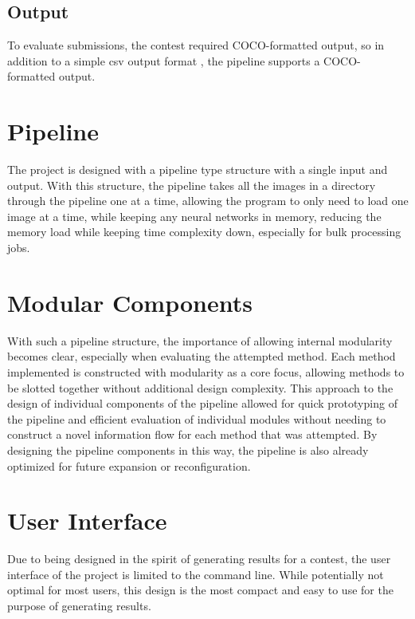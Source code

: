\subsection{Output}

To evaluate submissions, the contest required COCO-formatted output, so in addition to a simple csv output format , the pipeline supports a COCO-formatted output.

\section{Pipeline}

The project is designed with a pipeline type structure with a single input and output. With this structure, the pipeline takes all the images in a directory through the pipeline one at a time, allowing the program to only need to load one image at a time, while keeping any neural networks in memory, reducing the memory load while keeping time complexity down, especially for bulk processing jobs.

\section{Modular Components}

With such a pipeline structure, the importance of allowing internal modularity becomes clear, especially when evaluating the attempted method. Each method implemented is constructed with modularity as a core focus, allowing methods to be slotted together without additional design complexity. This approach to the design of individual components of the pipeline allowed for quick prototyping of the pipeline and efficient evaluation of individual modules without needing to construct a novel information flow for each method that was attempted. By designing the pipeline components in this way, the pipeline is also already optimized for future expansion or reconfiguration.

\section{User Interface}

Due to being designed in the spirit of generating results for a contest, the user interface of the project is limited to the command line. While potentially not optimal for most users, this design is the most compact and easy to use for the purpose of generating results.
